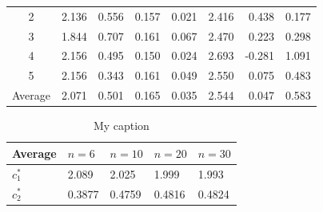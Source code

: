 \documentclass[11pt,a4paper]{article}
\numberwithin{equation}{subsection}
\begin{document}
\begin{table}[!h]
\begin{tabular}{|c|r|r|r|r|r|r|r|}
2                      & 2.136                            & 0.556                            & 0.157                                                                         & 0.021                                                                        & 2.416                            & 0.438                            & 0.177                                                                        \\ \cline{1-1}
3                      & 1.844                            & 0.707                            & 0.161                                                                         & 0.067                                                                        & 2.470                            & 0.223                            & 0.298                                                                        \\ \cline{1-1}
4                      & 2.156                            & 0.495                            & 0.150                                                                         & 0.024                                                                        & 2.693                            & -0.281                           & 1.091                                                                        \\ \cline{1-1}
5                      & 2.156                            & 0.343                            & 0.161                                                                         & 0.049                                                                        & 2.550                            & 0.075                            & 0.483                                                                        \\ \cline{1-1}
Average                & 2.071                            & 0.501                            & 0.165                                                                         & 0.035                                                                        & 2.544                            & 0.047                            & 0.583                                                                        \\ \hline
\end{tabular}
\egroup
\end{table}

\begin{table}[!h]
\centering
\caption{My caption}
\label{my-label}
\bgroup
\def\arraystretch{1.3}
\begin{tabular}{|l|l|l|l|l|}
\hline
Average & $n=6$  & $n=10$ & $n=20$ & $n=30$ \\ \hline
$c_1^*$ & 2.089  & 2.025  & 1.999  & 1.993  \\ \cline{1-1}
$c_2^*$ & 0.3877 & 0.4759 & 0.4816 & 0.4824 \\ \hline
\end{tabular} 
\egroup
\end{table}
\newpage
\end{document}
